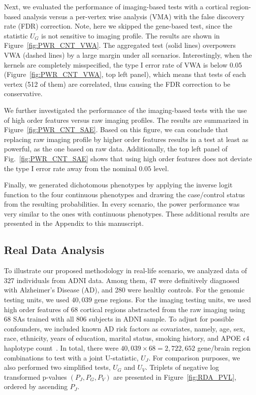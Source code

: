 \documentclass[11pt]{article}
\begin{document}
Next, we evaluated the performance of imaging-based tests with a cortical region-based analysis versus a per-vertex wise analysis (VMA) with the false discovery rate (FDR) correction. Note, here we skipped the gene-based test, since the statistic $U_G$ is not sensitive to imaging profile. The results are shown in Figure~\ref{fig:PWR_CNT_VWA}. The aggregated test (solid lines) overpowers VWA (dashed lines) by a large margin under all scenarios. Interestingly, when the kernels are completely misspecified, the type I error rate of VWA is below 0.05 (Figure~\ref{fig:PWR_CNT_VWA}, top left panel), which means that tests of each vertex (512 of them) are correlated, thus causing the FDR correction to be conservative. 

We further investigated the performance of the imaging-based tests with the use of high order features versus raw imaging profiles. The results are summarized in Figure~\ref{fig:PWR_CNT_SAE}. Based on this figure, we can conclude that replacing raw imaging profile by higher order features results in a test at least as powerful, as the one based on raw data. Additionally, the top left panel of Fig.~\ref{fig:PWR_CNT_SAE} shows that using high order features does not deviate the type I error rate away from the nominal $0.05$ level.

Finally, we generated dichotomous phenotypes by applying the inverse logit function to the four continuous phenotypes and drawing the case/control status from the resulting probabilities. In every scenario, the power performance was very similar to the ones with continuous phenotypes. These additional results are presented in the Appendix to this manuscript. 

\subsection*{Real Data Analysis}
To illustrate our proposed methodology in real-life scenario, we analyzed data of 327 individuals from ADNI data. Among them, 47 were definitively diagnosed with Alzheimer's Disease (AD), and 280 were healthy controls. For the genomic testing units, we used $40,039$ gene regions. For the imaging testing units, we used high order features of 68 cortical regions abstracted from the raw imaging using 68 SAs trained with all 806 subjects in ADNI sample. To adjust for possible confounders, we included known AD risk factors as covariates, namely, age, sex, race, ethnicity, years of education, marital status, smoking history, and APOE $\epsilon4$ haplotype count~\citep{AD:EPI1,AD:Marriage1}. In total, there were $40,039 \times 68 = 2,722,652$ gene/brain region combinations to test with a joint U-statistic, $U_J$. For comparison purposes, we also performed two simplified tests, $U_G$ and $U_V$. Triplets of negative log transformed p-values $(P_J, P_G, P_V)$ are presented in Figure~\ref{fig:RDA_PVL}, ordered by ascending $P_J$.
\end{document}
